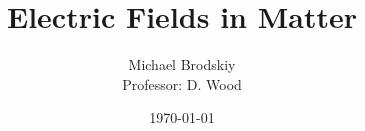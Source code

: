 


\title{Electric Fields in Matter}
\date{\today}
\author{Michael Brodskiy\\ \small Professor: D. Wood}



\maketitle

